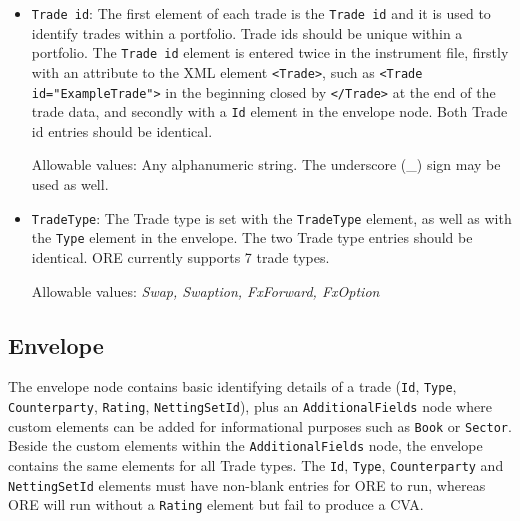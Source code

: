 \begin{itemize}
\item {\tt Trade id}: The first element of each trade is the {\tt Trade id} and it is used to identify trades within a portfolio. Trade ids should be unique within a portfolio.  The {\tt Trade id} element is entered twice in the instrument file, firstly with an attribute to the XML element {\tt <Trade>}, such as {\tt <Trade id="ExampleTrade">}  in the beginning closed by {\tt </Trade>}  at the end of the trade data, and secondly with a {\tt Id} element  in the envelope node.   Both Trade id entries should be identical.

Allowable values:  Any alphanumeric string. The underscore (\_) sign may be used as well. 


\item {\tt TradeType}: The Trade type is set with the {\tt TradeType} element, as well as with the {\tt Type} element in the envelope. The two Trade type entries should be identical. ORE currently supports 7 trade types.  

Allowable values:  \emph{Swap, Swaption, FxForward, FxOption}


\end{itemize}

\subsection{Envelope}\label{ss:envelope}
The envelope node contains basic identifying details of a trade ({\tt Id}, {\tt Type}, {\tt Counterparty}, {\tt Rating}, {\tt NettingSetId}), plus an {\tt AdditionalFields} node where custom elements can be added for informational purposes such as {\tt Book} or {\tt Sector}. Beside the custom elements within the {\tt AdditionalFields} node, the envelope contains the same elements for all Trade types.  The {\tt Id}, {\tt Type}, {\tt Counterparty} and {\tt NettingSetId} elements must have non-blank entries for ORE to run, whereas ORE will run without a {\tt Rating} element but fail to produce a CVA.

\vspace{1em}

